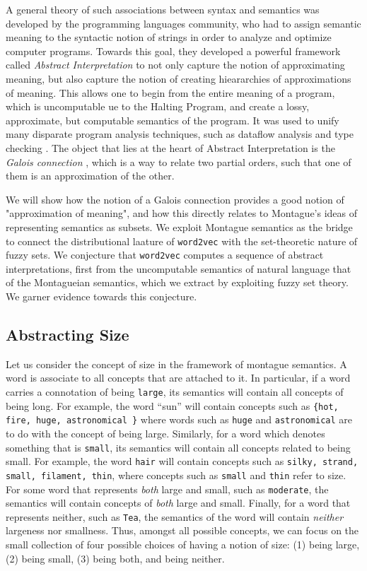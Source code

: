 \documentclass[11pt]{book}
\begin{document}
A general theory of such associations between syntax and semantics 
was developed by the programming languages community, who had to assign semantic
meaning to the syntactic notion of strings in order to analyze and optimize 
computer programs. Towards this goal, they developed a powerful framework
called \emph{Abstract Interpretation} \cite{cousot1977abstract} to not
only capture the notion of approximating meaning, but also capture the notion of
creating hieararchies of approximations of meaning. This allows one to
begin from the entire meaning of a program, which is uncomputable ue to the Halting Program,
and create a lossy, approximate, but computable semantics of the program.
It was used to unify many disparate program analysis techniques, such as
dataflow analysis \cite{khedker2017data} and type checking \cite{file1991abstract}. 
The object that lies at the heart of Abstract Interpretation is the \emph{Galois connection} 
\cite{cousot1992comparing}, which is a way to relate two partial orders, such
that one of them is an approximation of the other. 


We will show how the notion of a Galois connection provides a good notion of
"approximation of meaning", and how this directly relates to Montague's ideas
of representing semantics as subsets.  We exploit Montague semantics as the
bridge to connect the distributional laature of \texttt{word2vec} with the
set-theoretic nature of fuzzy sets. We conjecture that \texttt{word2vec}
computes a sequence of abstract interpretations, first from the uncomputable
semantics of natural language that of the Montagueian semantics, which we
extract by exploiting fuzzy set theory. We garner evidence towards this
conjecture.



\subsection{Abstracting Size}

Let us consider the concept of size in the framework of montague semantics.  A
word is associate to all concepts that are attached to it. In particular, if a
word carries a connotation of being \texttt{large}, its semantics will contain
all concepts of being long. For example, the word ``sun'' will contain 
concepts such as \texttt{\{hot, fire, huge, astronomical \}} where words such as 
\texttt{huge} and \texttt{astronomical} are to do with the concept of being large.
Similarly, for a word which denotes something that
is \texttt{small}, its semantics will contain all concepts related to being small. For example,
the word \texttt{hair} will contain concepts such as \texttt{silky, strand, small, filament, thin},
where concepts such as \texttt{small} and \texttt{thin} refer to size.
For some word that represents \emph{both} large and small, such as \texttt{moderate},
the semantics will contain concepts of \emph{both} large and small.
Finally, for a word that represents neither, such as \texttt{Tea}, the semantics of the word
will contain \emph{neither} largeness nor smallness. Thus, amongst all possible
concepts, we can focus on the small collection of four possible choices of
having a notion of size: (1) being large, (2) being small, (3) being both, and
being neither.
\end{document}
